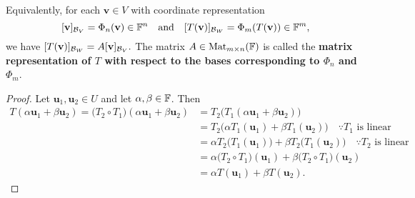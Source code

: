 \documentclass[11pt,openany]{article}
\renewcommand{\vec}[1]{\mathbf{#1}}
\begin{document}
\begin{observation}
\begin{center}
\end{center} Equivalently, for each $\vec{v}\in V$ with coordinate representation \[
[\vec{v}]_{\basis_V} =\Phi_n(\vec{v})\in \F^n\quad\text{and}\quad[T(\vec{v})]_{\basis_W}=\Phi_m(T(\vec{v}))\in\F^m,
\] we have $
[T(\vec{v})]_{\basis_W}=A[\vec{v}]_{\basis_V}.$ The matrix $A\in\operatorname{Mat}_{m\times n}(\mathbb{F})$ is called the \textbf{matrix representation of $T$ with respect to the bases corresponding to $\Phi_n$ and $\Phi_m$}.
\vfill
{}
\begin{proof}
Let \( \vec{u}_1, \vec{u}_2 \in U \) and let \( \alpha, \beta \in \mathbb{F} \). Then \begin{align*}
T(\alpha \vec{u}_1 + \beta \vec{u}_2) = \bigl(T_2 \circ T_1\bigr)(\alpha \vec{u}_1 + \beta \vec{u}_2) &= T_2\bigl(T_1(\alpha \vec{u}_1 + \beta \vec{u}_2)\bigr) \\
&= T_2\bigl(\alpha T_1(\vec{u}_1) + \beta T_1(\vec{u}_2)\bigr)\quad\because\text{$T_1$ is linear} \\
&= \alpha T_2\bigl(T_1(\vec{u}_1)\bigr) + \beta T_2\bigr(T_1(\vec{u}_2)\bigr)\quad\because\text{$T_2$ is linear} \\
&= \alpha \bigl(T_2\circ T_1\bigr)(\vec{u}_1) + \beta \bigr(T_2\circ T_1\bigr)(\vec{u}_2) \\
&= \alpha T(\vec{u}_1) + \beta T(\vec{u}_2).
\end{align*}
\end{proof}


\end{observation}
\end{document}
